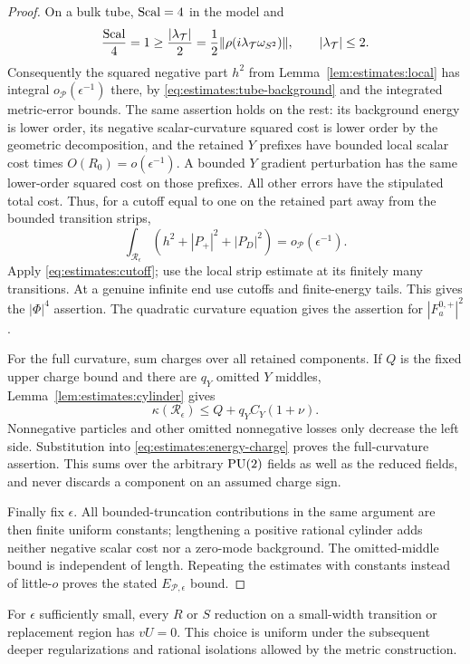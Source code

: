 \begin{proof}
On a bulk tube, $\operatorname{Scal}=4$ in the model and
\[
 \frac{\operatorname{Scal}}{4}=1\geq\frac{|\lambda_{\mathcal T}|}{2}
   =\frac12\|\rho(i\lambda_{\mathcal T}\omega_{S^2})\|,
 \qquad |\lambda_{\mathcal T}|\leq2.
\]
Consequently the squared negative part $h^2$ from
Lemma~\ref{lem:estimates:local} has integral
$o_{\mathcal P}(\epsilon^{-1})$ there, by
\eqref{eq:estimates:tube-background} and the integrated metric-error
bounds.  The same assertion holds on the rest: its background
energy is lower order, its negative scalar-curvature squared cost
is lower order by the geometric decomposition, and the retained
$Y$ prefixes have bounded local scalar cost times
$O(R_0)=o(\epsilon^{-1})$.  A bounded $Y$ gradient perturbation has
the same lower-order squared cost on those prefixes.  All other
errors have the stipulated total cost.  Thus, for a cutoff equal
to one on the retained part away from the bounded transition strips,
\[
 \int_{\mathcal R_\epsilon}(h^2+|P_+|^2+|P_D|^2)
                        =o_{\mathcal P}(\epsilon^{-1}).
\]
Apply \eqref{eq:estimates:cutoff}; use the local strip estimate at its
finitely many transitions.  At a genuine infinite end use cutoffs
and finite-energy tails.  This gives the $|\Phi|^4$ assertion.
The quadratic curvature equation gives the assertion for
$|F_a^{0,+}|^2$.

For the full curvature, sum charges over all retained components.
If $Q$ is the fixed upper charge bound and there are $q_Y$ omitted
$Y$ middles, Lemma~\ref{lem:estimates:cylinder} gives
\begin{equation}
       \kappa(\mathcal R_\epsilon)
       \leq Q+q_YC_Y(1+\nu).
       \label{eq:estimates:retained-charge}
\end{equation}
Nonnegative particles and other omitted nonnegative losses only
decrease the left side.  Substitution into
\eqref{eq:estimates:energy-charge} proves the full-curvature
assertion.  This sums over the arbitrary $\operatorname{PU}(2)$ fields as well as
the reduced fields, and never discards a component on an assumed
charge sign.

Finally fix $\epsilon$.  All bounded-truncation contributions in the
same argument are then finite uniform constants; lengthening a
positive rational cylinder adds neither negative scalar cost nor
a zero-mode background.  The omitted-middle bound is independent
of length.  Repeating the estimates with constants instead of
little-$o$ proves the stated $E_{\mathcal P,\epsilon}$ bound.
\end{proof}

\begin{corollary}
\label{cor:estimates:tube}
For $\epsilon$ sufficiently small, every $R$ or $S$ reduction on a
small-width transition or replacement region has $vU=0$.
This choice is uniform under the subsequent deeper regularizations
and rational isolations allowed by the metric construction.
\end{corollary}

